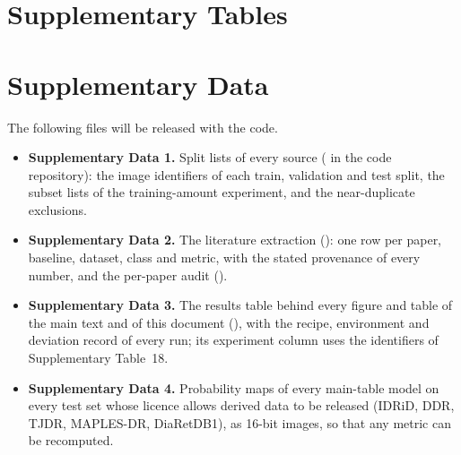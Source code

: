 \documentclass[10pt,letterpaper]{article}
\begin{document}


\clearpage
\section{Supplementary Tables}


\clearpage

\clearpage

\clearpage

\clearpage

\clearpage

\clearpage

\clearpage

\clearpage

\clearpage

\clearpage

\clearpage

\clearpage

\clearpage

\clearpage

\clearpage

\clearpage

\clearpage


\clearpage
\section*{Supplementary Data}
\noindent The following files will be released with the code.
\begin{itemize}[leftmargin=*,itemsep=2pt]
\item \textbf{Supplementary Data 1.} Split lists of every source ( in the code repository): the image identifiers of each train, validation and test split, the subset lists of the training-amount experiment, and the near-duplicate exclusions.
\item \textbf{Supplementary Data 2.} The literature extraction (): one row per paper, baseline, dataset, class and metric, with the stated provenance of every number, and the per-paper audit ().
\item \textbf{Supplementary Data 3.} The results table behind every figure and table of the main text and of this document (), with the recipe, environment and deviation record of every run; its experiment column uses the identifiers of Supplementary Table~18.
\item \textbf{Supplementary Data 4.} Probability maps of every main-table model on every test set whose licence allows derived data to be released (IDRiD, DDR, TJDR, MAPLES-DR, DiaRetDB1), as 16-bit images, so that any metric can be recomputed.
\end{itemize}
\end{document}
